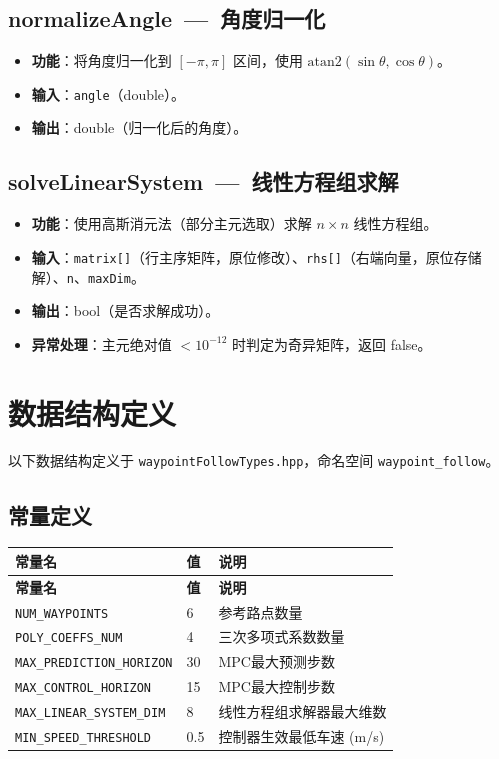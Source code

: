 \documentclass[a4paper,10pt]{article}
\begin{document}
\subsection{normalizeAngle~---~角度归一化}

\begin{itemize}
  \item \textbf{功能}：将角度归一化到 $[-\pi, \pi]$ 区间，使用 $\text{atan2}(\sin\theta, \cos\theta)$。
  \item \textbf{输入}：\texttt{angle}（double）。
  \item \textbf{输出}：double（归一化后的角度）。
\end{itemize}

\subsection{solveLinearSystem~---~线性方程组求解}

\begin{itemize}
  \item \textbf{功能}：使用高斯消元法（部分主元选取）求解 $n \times n$ 线性方程组。
  \item \textbf{输入}：\texttt{matrix[]}（行主序矩阵，原位修改）、\texttt{rhs[]}（右端向量，原位存储解）、\texttt{n}、\texttt{maxDim}。
  \item \textbf{输出}：bool（是否求解成功）。
  \item \textbf{异常处理}：主元绝对值 $< 10^{-12}$ 时判定为奇异矩阵，返回 false。
\end{itemize}

\section{数据结构定义}

以下数据结构定义于 \texttt{waypointFollowTypes.hpp}，命名空间 \texttt{waypoint\_follow}。

\subsection{常量定义}

\begin{longtable}{|L{4.5cm}|C{1.5cm}|L{9cm}|}
\hline
\textbf{常量名} & \textbf{值} & \textbf{说明} \\
\hline
\endfirsthead
\hline
\textbf{常量名} & \textbf{值} & \textbf{说明} \\
\hline
\endhead
\texttt{NUM\_WAYPOINTS} & 6 & 参考路点数量 \\
\hline
\texttt{POLY\_COEFFS\_NUM} & 4 & 三次多项式系数数量 \\
\hline
\texttt{MAX\_PREDICTION\_HORIZON} & 30 & MPC最大预测步数 \\
\hline
\texttt{MAX\_CONTROL\_HORIZON} & 15 & MPC最大控制步数 \\
\hline
\texttt{MAX\_LINEAR\_SYSTEM\_DIM} & 8 & 线性方程组求解器最大维数 \\
\hline
\texttt{MIN\_SPEED\_THRESHOLD} & 0.5 & 控制器生效最低车速 (m/s) \\
\hline
\end{longtable}
\end{document}
